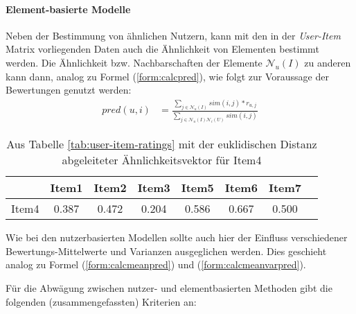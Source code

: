 \paragraph{Element-basierte Modelle} Neben der Bestimmung von ähnlichen Nutzern, kann mit den in der \textit{User-Item} Matrix vorliegenden Daten auch die Ähnlichkeit von Elementen bestimmt werden. Die Ähnlichkeit bzw. Nachbarschaften der Elemente $\mathcal{N}_u(I)$ zu anderen kann dann, analog zu Formel (\ref{form:calcpred}), wie folgt zur Voraussage der Bewertungen genutzt werden: 
\begin{align}
pred(u,i) & = \frac{ \sum_{j \in \mathcal{N}_u(I)} sim(i,j)*r_{u,j}}{ \sum_{j \in \mathcal{N}_u(I)\mathcal{N}_i(U)} sim(i,j) } \label{form:calcpreditem}
\end{align}
\begin{table}
  \centering
  \begin{tabular}{ | l || c | c | c | c | c | c | c | }
    \hline
           & Item1 & Item2 & Item3 & Item5 & Item6 & Item7 \\ \hline
Item4 &    0.387 &	0.472 &	0.204 & 0.586 & 0.667 & 0.500 \\	
    \hline
  \end{tabular}
  \caption{\footnotesize Aus Tabelle \ref{tab:user-item-ratings} mit der euklidischen Distanz abgeleiteter Ähnlichkeitsvektor für Item4}
  \label{tab:item-item-sim}
\end{table}
Wie bei den nutzerbasierten Modellen sollte auch hier der Einfluss verschiedener Bewertungs-Mittelwerte und Varianzen ausgeglichen werden. Dies geschieht analog zu Formel (\ref{form:calcmeanpred}) und (\ref{form:calcmeanvarpred}).  

Für die Abwägung zwischen nutzer- und elementbasierten Methoden gibt \citep{hb_04} die folgenden (zusammengefassten) Kriterien an:

